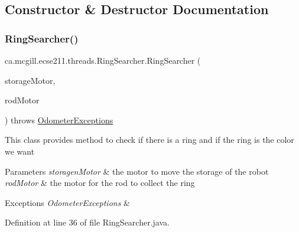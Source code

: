 \subsection{Constructor \& Destructor Documentation}
\mbox{\label{classca_1_1mcgill_1_1ecse211_1_1threads_1_1_ring_searcher_a58fdaba16c2b961446d1474b76e66e49}} 
\subsubsection{\texorpdfstring{Ring\+Searcher()}{RingSearcher()}}
{\footnotesize\ttfamily ca.\+mcgill.\+ecse211.\+threads.\+Ring\+Searcher.\+Ring\+Searcher (\begin{DoxyParamCaption}\item[{E\+V3\+Large\+Regulated\+Motor}]{storage\+Motor,  }\item[{E\+V3\+Medium\+Regulated\+Motor}]{rod\+Motor }\end{DoxyParamCaption}) throws \hyperlink{classca_1_1mcgill_1_1ecse211_1_1odometer_1_1_odometer_exceptions}{Odometer\+Exceptions}}

This class provides method to check if there is a ring and if the ring is the color we want


\begin{DoxyParams}{Parameters}
{\em storagen\+Motor} & the motor to move the storage of the robot \\
\hline
{\em rod\+Motor} & the motor for the rod to collect the ring \\
\hline
\end{DoxyParams}

\begin{DoxyExceptions}{Exceptions}
{\em Odometer\+Exceptions} & \\
\hline
\end{DoxyExceptions}


Definition at line 36 of file Ring\+Searcher.\+java.


